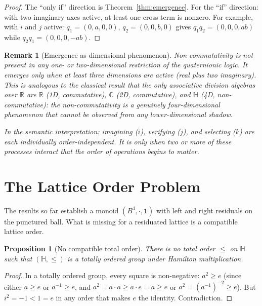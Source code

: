 \documentclass[11pt,a4paper]{article}
\newtheorem{proposition}[theorem]{Proposition}
\newtheorem{remark}[theorem]{Remark}
\newcommand{\Hq}{\mathbb{H}}
\begin{document}
\begin{proof}
The ``only if'' direction is Theorem~\ref{thm:emergence}. For the
``if'' direction: with two imaginary axes active, at least one cross
term is nonzero. For example, with $i$ and $j$ active:
$q_1 = (0, a, 0, 0)$, $q_2 = (0, 0, b, 0)$ gives
$q_1 q_2 = (0, 0, 0, ab)$ while $q_2 q_1 = (0, 0, 0, -ab)$.
\end{proof}

\begin{remark}[Emergence as dimensional phenomenon]
Non-commutativity is not present in any one- or two-dimensional
restriction of the quaternionic logic. It emerges only when at least
three dimensions are active (real plus two imaginary). This is
analogous to the classical result that the only associative division
algebras over $\mathbb{R}$ are $\mathbb{R}$ (1D, commutative),
$\mathbb{C}$ (2D, commutative), and $\Hq$ (4D, non-commutative): the
non-commutativity is a genuinely four-dimensional phenomenon that cannot
be observed from any lower-dimensional shadow.

In the semantic interpretation: imagining ($i$), verifying ($j$), and
selecting ($k$) are each individually order-independent. It is only
when \emph{two or more} of these processes interact that the order of
operations begins to matter.
\end{remark}

\section{The Lattice Order Problem}
\label{sec:obstruction}

The results so far establish a monoid $(B^4, \cdot, \mathbf{1})$ with
left and right residuals on the punctured ball. What is missing for a
residuated lattice is a compatible lattice order.

\begin{proposition}[No compatible total order]
\label{prop:no-total-order}
There is no total order $\leq$ on $\Hq$ such that $(\Hq, \leq)$ is a
totally ordered group under Hamilton multiplication.
\end{proposition}

\begin{proof}
In a totally ordered group, every square is non-negative:
$a^2 \geq e$ (since either $a \geq e$ or $a^{-1} \geq e$, and
$a^2 = a \cdot a \geq a \cdot e = a \geq e$ or
$a^2 = (a^{-1})^{-2} \geq e$). But $i^2 = -1 < 1 = e$ in any
order that makes $e$ the identity. Contradiction.
\end{proof}
\end{document}
